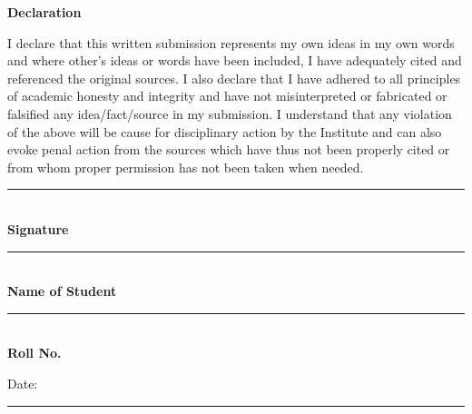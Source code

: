 \thispagestyle{empty}

\begin{center}
{\Large \textbf{Declaration}}%
\end{center}

\setlength{\parindent}{0em}
I declare that this written submission represents my own ideas in my own words and where other's ideas or words have been included, I have
adequately cited and referenced the original sources. I also declare that I have adhered to all principles of academic honesty and integrity
and have not misinterpreted or fabricated or falsified any idea/fact/source in my submission. I understand that any violation of the above
will be cause for disciplinary action by the Institute and can also evoke penal action from the sources which have thus not been properly
cited or from whom proper permission has not been taken when needed.

\vspace{2cm}


\begin{flushright}
\rule{8cm}{.4pt}\\
\textbf{Signature} \\
\vspace{1cm}
\rule{8cm}{.4pt}\\
\textbf{Name of Student} \\
\vspace{1cm}
\rule{8cm}{.4pt}\\
\textbf{Roll No.} \\
\vspace{2cm}
\end{flushright}

\begin{flushleft}
Date: \rule{4cm}{.4pt}\\
\end{flushleft}

\afterpage{\blankpage}
\clearpage
